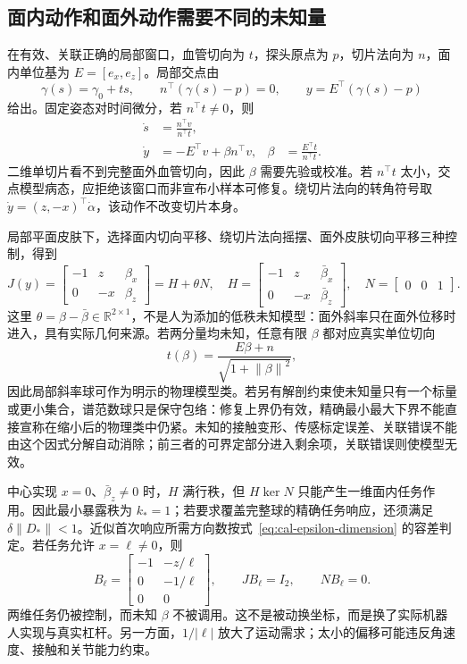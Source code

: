 \documentclass[11pt,a4paper]{article}
\numberwithin{equation}{section}
\theoremstyle{definition}
\newcommand{\R}{\mathbb R}
\newcommand{\norm}[1]{\left\lVert#1\right\rVert}
\begin{document}
\subsection{面内动作和面外动作需要不同的未知量}
在有效、关联正确的局部窗口，血管切向为 $t$，探头原点为 $p$，切片法向为 $n$，面内单位基为 $E=[e_x,e_z]$。局部交点由
\begin{equation}
 \gamma(s)=\gamma_0+ts,\qquad
 n^\top(\gamma(s)-p)=0,\qquad
 y=E^\top(\gamma(s)-p)
\end{equation}
给出。固定姿态对时间微分，若 $n^\top t\ne0$，则
\begin{align}
 \dot s&=\frac{n^\top v}{n^\top t},\\
 \dot y&=-E^\top v+\beta n^\top v,
 &\beta&=\frac{E^\top t}{n^\top t}.
\end{align}
二维单切片看不到完整面外血管切向，因此 $\beta$ 需要先验或校准。若 $n^\top t$ 太小，交点模型病态，应拒绝该窗口而非宣布小样本可修复。绕切片法向的转角符号取 $\dot y=(z,-x)^\top\dot\alpha$，该动作不改变切片本身。

局部平面皮肤下，选择面内切向平移、绕切片法向摇摆、面外皮肤切向平移三种控制，得到
\begin{equation}
 J(y)=
 \begin{bmatrix}-1&z&\beta_x\\0&-x&\beta_z\end{bmatrix}
 =H+\theta N,\quad
 H=\begin{bmatrix}-1&z&\bar\beta_x\\0&-x&\bar\beta_z\end{bmatrix},\quad
 N=\begin{bmatrix}0&0&1\end{bmatrix}.
\end{equation}
这里 $\theta=\beta-\bar\beta\in\R^{2\times1}$，不是人为添加的低秩未知模型：面外斜率只在面外位移时进入，具有实际几何来源。若两分量均未知，任意有限 $\beta$ 都对应真实单位切向
\begin{equation}
 t(\beta)=\frac{E\beta+n}{\sqrt{1+\norm{\beta}^2}},
\end{equation}
因此局部斜率球可作为明示的物理模型类。若另有解剖约束使未知量只有一个标量或更小集合，谱范数球只是保守包络：修复上界仍有效，精确最小最大下界不能直接宣称在缩小后的物理类中仍紧。未知的接触变形、传感标定误差、关联错误不能由这个因式分解自动消除；前三者的可界定部分进入剩余项，关联错误则使模型无效。

中心实现 $x=0$、$\bar\beta_z\ne0$ 时，$H$ 满行秩，但 $H\ker N$ 只能产生一维面内任务作用。因此最小暴露秩为 $k_*=1$；若要求覆盖完整球的精确任务响应，还须满足 $\delta\|D_*\|<1$。近似首次响应所需方向数按式~\eqref{eq:cal-epsilon-dimension} 的容差判定。若任务允许 $x=\ell\ne0$，则
\begin{equation}
 B_\ell=
 \begin{bmatrix}
 -1&-z/\ell\\0&-1/\ell\\0&0
 \end{bmatrix},\qquad
 JB_\ell=I_2,\qquad NB_\ell=0.
\end{equation}
两维任务仍被控制，而未知 $\beta$ 不被调用。这不是被动换坐标，而是换了实际机器人实现与真实杠杆。另一方面，$1/|\ell|$ 放大了运动需求；太小的偏移可能违反角速度、接触和关节能力约束。
\end{document}
